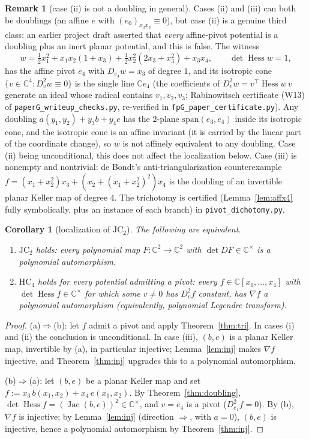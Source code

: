 \documentclass[11pt]{article}
\theoremstyle{plain}
\newtheorem{corollary}[theorem]{Corollary}
\theoremstyle{definition}
\newtheorem{remark}[theorem]{Remark}
\newcommand{\C}{\mathbb{C}}
\newcommand{\Hess}{\operatorname{Hess}}
\newcommand{\Jac}{\operatorname{Jac}}
\newcommand{\HC}{\mathrm{HC}}
\newcommand{\JC}{\mathrm{JC}}
\begin{document}
\begin{remark}[case (ii) is not a doubling in
general]\label{rem:notdoubling}
Cases (ii) and (iii) can both be doublings (an affine $e$ with
$(e_0)_{x_3x_3}\equiv0$), but case (ii) is a genuine third class: an
earlier project draft asserted that \emph{every} affine-pivot potential
is a doubling plus an inert planar potential, and this is false. The
witness
\[
w=\tfrac12x_1^2+x_1x_2(1+x_3)+\tfrac12x_2^2(2x_3+x_3^2)+x_3x_4,
\qquad\det\Hess w=1,
\]
has the affine pivot $e_4$ with $D_{e_4}w=x_3$ of degree $1$, and its
isotropic cone $\{v\in\C^4:D_v^2w\equiv0\}$ is the single line $\C e_4$
(the coefficients of $D_v^2w=v^{\top}\Hess w\,v$ generate an ideal whose
radical contains $v_1,v_2,v_3$; Rabinowitsch certificate (W13) of
\texttt{paperG\_writeup\_checks.py}, re-verified in
\texttt{fpG\_paper\_certificate.py}). Any doubling
$a(y_1,y_2)+y_3b+y_4e$ has the $2$-plane $\mathrm{span}(e_3,e_4)$ inside
its isotropic cone, and the isotropic cone is an affine invariant (it is
carried by the linear part of the coordinate change), so $w$ is not
affinely equivalent to any doubling. Case (ii) being unconditional, this
does not affect the localization below. Case (iii) is nonempty and
nontrivial: de Bondt's anti-triangularization counterexample
$f=(x_1+x_2^2)x_3+(x_2+(x_1+x_2^2)^2)x_4$ \cite{deBondt2015} is the
doubling of an invertible planar Keller map of degree $4$. The trichotomy
is certified (Lemma~\ref{lem:affx4} fully symbolically, plus an instance
of each branch) in \texttt{pivot\_dichotomy.py}.
\end{remark}

\begin{corollary}[localization of $\JC_2$]\label{cor:headline}
The following are equivalent.
\begin{enumerate}
\item[\rm(a)] $\JC_2$ holds: every polynomial map $F:\C^2\to\C^2$ with
$\det DF\in\C^{\times}$ is a polynomial automorphism.
\item[\rm(b)] $\HC_4$ holds for every potential admitting a pivot: every
$f\in\C[x_1,\dots,x_4]$ with $\det\Hess f\in\C^{\times}$ for which some
$v\ne0$ has $D_v^2f$ constant, has $\nabla f$ a polynomial automorphism
(equivalently, polynomial Legendre transform).
\end{enumerate}
\end{corollary}

\begin{proof}
(a)$\Rightarrow$(b): let $f$ admit a pivot and apply
Theorem~\ref{thm:tri}. In cases (i) and (ii) the conclusion is
unconditional. In case (iii), $(b,e)$ is a planar Keller map, invertible
by (a), in particular injective; Lemma~\ref{lem:inj} makes $\nabla f$
injective, and Theorem~\ref{thm:inj} upgrades this to a polynomial
automorphism.

(b)$\Rightarrow$(a): let $(b,e)$ be a planar Keller map and set
$f:=x_3\,b(x_1,x_2)+x_4\,e(x_1,x_2)$. By Theorem~\ref{thm:doubling},
$\det\Hess f=(\Jac(b,e))^2\in\C^{\times}$, and $v=e_4$ is a pivot
($D_{e_4}^2f=0$). By (b), $\nabla f$ is injective; by
Lemma~\ref{lem:inj} (direction $\Rightarrow$, with $a=0$), $(b,e)$ is
injective, hence a polynomial automorphism by Theorem~\ref{thm:inj}.
\end{proof}
\end{document}
